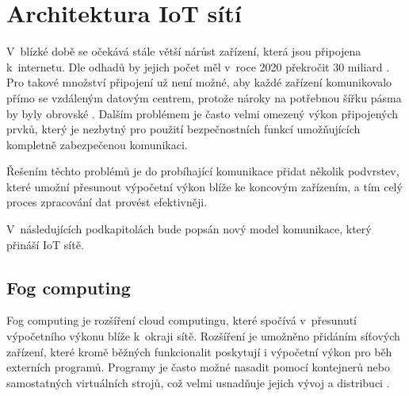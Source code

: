 \section{Architektura IoT sítí}
  V~blízké době se očekává stále větší nárůst zařízení, která jsou připojena k~internetu.
  Dle odhadů by jejich počet měl v~roce 2020 překročit 30 miliard \cite{iotDevices}.
  Pro takové množství připojení už není možné, aby každé zařízení komunikovalo přímo
  se vzdáleným datovým centrem, protože nároky na potřebnou šířku pásma by byly 
  obrovské \cite{fog}.
  Dalším problémem je často velmi omezený výkon připojených prvků, který je nezbytný pro 
  použití bezpečnostních funkcí umožňujících kompletně zabezpečenou komunikaci. 
  
  Řešením těchto problémů je do probíhající komunikace přidat několik podvrstev, 
  které umožní přesunout výpočetní výkon blíže ke koncovým zařízením, a tím celý
  proces zpracování dat provést efektivněji.
  
  V~následujících podkapitolách bude popsán nový model komunikace, který přináší 
  IoT sítě.
 \subsection{Fog computing} 
 Fog computing je rozšíření cloud computingu, které spočívá v~přesunutí výpočetního
 výkonu blíže k~okraji sítě. Rozšíření je umožněno přidáním síťových zařízení,
 které kromě běžných funkcionalit poskytují i výpočetní výkon pro běh externích programů. Programy 
 je často možné nasadit pomocí kontejnerů nebo samostatných virtuálních strojů, což 
 velmi usnadňuje jejich vývoj a distribuci \cite{fog}.
 
